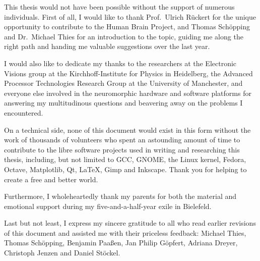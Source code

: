 {\begingroup
	\cleardoublepage
	\begin{acknowledgement}
		This thesis would not have been possible without the support of numerous individuals. First of all, I would like to thank Prof.\@~Ulrich Rückert for the unique opportunity to contribute to the Human Brain Project, and Thomas Schöpping and Dr.\@~Michael Thies for an introduction to the topic, guiding me along the right path and handing me valuable suggestions over the last year.
		
		I would also like to dedicate my thanks to the researchers at the Electronic Visions group at the Kirchhoff-Institute for Physics in Heidelberg, the Advanced Processor Technologies Research Group at the University of Manchester, and everyone else involved in the neuromorphic hardware and software platforms for answering my multitudinous questions and beavering away on the problems I encountered.

		On a technical side, none of this document would exist in this form without the work of thousands of volunteers who spent an astounding amount of time to contribute to the libre software projects used in writing and researching this thesis, including, but not limited to GCC, GNOME, the Linux kernel, Fedora, Octave, Matplotlib, Qt, \LaTeX, Gimp and Inkscape. Thank you for helping to create a free and better world.

		Furthermore, I wholeheartedly thank my parents for both the material and emotional support during my five-and-a-half-year exile in Bielefeld.%

		Last but not least, I express my sincere gratitude to all who read earlier revisions of this document and assisted me with their priceless feedback: Michael Thies, Thomas Schöpping, Benjamin Paaßen, Jan Philip Göpfert, Adriana Dreyer, Christoph Jenzen and Daniel Stöckel.
	\end{acknowledgement}
\endgroup}
